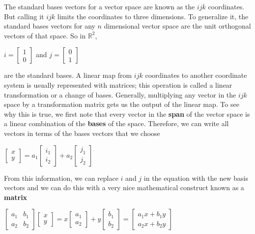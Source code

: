 \documentclass[12pt]{report}
\begin{document}
The standard bases vectors for a vector space are known as the $ijk$ coordinates. But calling it $ijk$ limits the coordinates to three dimensions. To generalize it, the standard bases vectors for any $n$ dimensional vector space are the unit orthogonal vectors of that space. So in $\mathbb{R}^2$,
\begin{center}$i = \begin{bmatrix}1 \\ 0\end{bmatrix}$ and $j = \begin{bmatrix}0 \\ 1\end{bmatrix}$\end{center}
are the standard bases.
A linear map from $ijk$ coordinates to another coordinate system is usually represented with matrices; this operation is called a linear transformation or a change of bases. Generally, multiplying any vector in the $ijk$ space by a transformation matrix gets us the output of the linear map. To see why this is true, we first note that every vector in the \textbf{span} of the vector space is a linear combination of the \textbf{bases} of the space. Therefore, we can write all vectors in terms of the bases vectors that we choose
\begin{center}
$\begin{bmatrix}x\\y\end{bmatrix}=a_1\begin{bmatrix}i_1\\i_2\end{bmatrix}+a_2\begin{bmatrix}j_{1}\\ j_2\end{bmatrix}$
\end{center}
From this information, we can replace $i$ and $j$ in the equation with the new basis vectors and we can do this with a very nice mathematical construct known as a \textbf{matrix}
\begin{center}
$\begin{bmatrix}a_1 & b_1 \\ a_2 & b_2\end{bmatrix}\begin{bmatrix}x \\ y\end{bmatrix}= x\begin{bmatrix}a_{1}\\ a_{2}\end{bmatrix}+y\begin{bmatrix}b_{1} \\ b_{2}\end{bmatrix} = \begin{bmatrix}a_{1}x+b_{1}y \\ a_{2}x+b_{2}y\end{bmatrix}$
\end{center}
\end{document}
